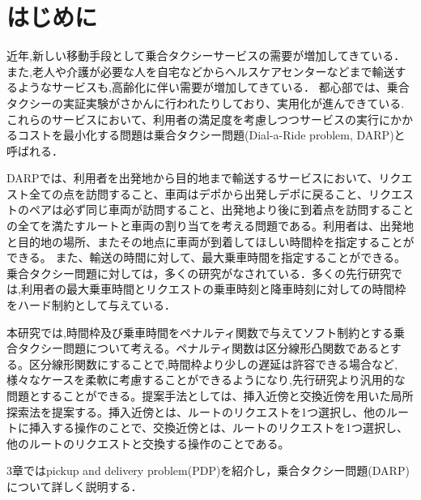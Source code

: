 \chapter{はじめに}
近年,新しい移動手段として乗合タクシーサービスの需要が増加してきている．また,老人や介護が必要な人を自宅などからヘルスケアセンターなどまで輸送するようなサービスも,高齢化に伴い需要が増加してきている．
都心部では、乗合タクシーの実証実験がさかんに行われたりしており、実用化が進んできている.
これらのサービスにおいて、利用者の満足度を考慮しつつサービスの実行にかかるコストを最小化する問題は乗合タクシー問題(Dial-a-Ride problem, DARP)と呼ばれる．

DARPでは、利用者を出発地から目的地まで輸送するサービスにおいて、リクエスト全ての点を訪問すること、車両はデポから出発しデポに戻ること、リクエストのペアは必ず同じ車両が訪問すること、出発地より後に到着点を訪問することの全てを満たすルートと車両の割り当てを考える問題である。利用者は、出発地と目的地の場所、またその地点に車両が到着してほしい時間枠を指定することができる。
また、輸送の時間に対して、最大乗車時間を指定することができる。
乗合タクシー問題に対しては，多くの研究がなされている．多くの先行研究では,利用者の最大乗車時間とリクエストの乗車時刻と降車時刻に対しての時間枠をハード制約として与えている．

本研究では,時間枠及び乗車時間をペナルティ関数で与えてソフト制約とする乗合タクシー問題について考える。ペナルティ関数は区分線形凸関数であるとする。区分線形関数にすることで,時間枠より少しの遅延は許容できる場合など,様々なケースを柔軟に考慮することができるようになり,先行研究より汎用的な問題とすることができる。提案手法としては、挿入近傍と交換近傍を用いた局所探索法を提案する。挿入近傍とは、ルートのリクエストを1つ選択し、他のルートに挿入する操作のことで、交換近傍とは、ルートのリクエストを1つ選択し、他のルートのリクエストと交換する操作のことである。

3章ではpickup and delivery problem(PDP)を紹介し，乗合タクシー問題(DARP)について詳しく説明する．

